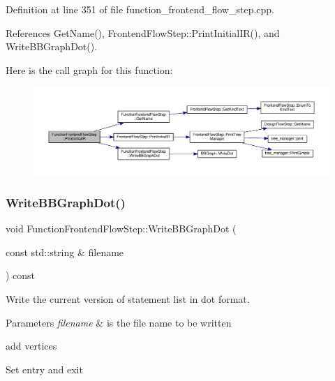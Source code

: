 Definition at line 351 of file function\+\_\+frontend\+\_\+flow\+\_\+step.\+cpp.



References Get\+Name(), Frontend\+Flow\+Step\+::\+Print\+Initial\+I\+R(), and Write\+B\+B\+Graph\+Dot().

Here is the call graph for this function\+:
\nopagebreak
\begin{figure}[H]
\begin{center}
\leavevmode
\includegraphics[width=350pt]{d8/d0a/classFunctionFrontendFlowStep_a65cf8273a7a4f4bc3ed85c04220349ad_cgraph}
\end{center}
\end{figure}
\mbox{\label{classFunctionFrontendFlowStep_a4b3ca147e7b029e207a85b60fd0cb592}} 
\subsubsection{\texorpdfstring{Write\+B\+B\+Graph\+Dot()}{WriteBBGraphDot()}}
{\footnotesize\ttfamily void Function\+Frontend\+Flow\+Step\+::\+Write\+B\+B\+Graph\+Dot (\begin{DoxyParamCaption}\item[{const std\+::string \&}]{filename }\end{DoxyParamCaption}) const\hspace{0.3cm}{\ttfamily [protected]}}



Write the current version of statement list in dot format. 


\begin{DoxyParams}{Parameters}
{\em filename} & is the file name to be written \\
\hline
\end{DoxyParams}
add vertices

Set entry and exit

